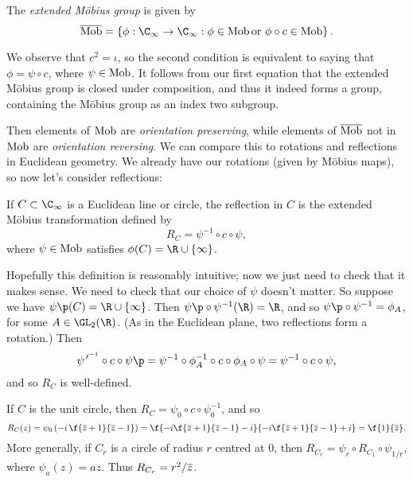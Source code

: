 \begin{definition}
	The \emph{extended Möbius group} is given by
	\begin{equation*}
		\overline{\Mobgp} = \left\{ \phi:\C_\infty \to \C_\infty : \phi\in\Mobgp \text{or } \phi\circ c\in\Mobgp \right\}.
	\end{equation*}
\end{definition}

We observe that $c^2=\iota$, so the second condition is equivalent to saying that $\phi = \psi\circ c$, where $\psi\in\operatorname{Mob}$. It follows from our first equation that the extended Möbius group is closed under composition, and thus it indeed forms a group, containing the Möbius group as an index two subgroup.

Then elements of $\operatorname{Mob}$ are \emph{orientation preserving}, while elements of $\overline{\operatorname{Mob}}$ not in $\operatorname{Mob}$ are \emph{orientation reversing}. We can compare this to rotations and reflections in Euclidean geometry. We already have our rotations (given by Möbius maps), so now let's consider reflections:

\begin{definition}
	If $C\subset\C_\infty$ is a Euclidean line or circle, the reflection in $C$ is the extended Möbius transformation defined by
	\begin{equation*}
		R_C = \psi^{-1} \circ c \circ \psi,
	\end{equation*}
	where $\psi\in\operatorname{Mob}$ satisfies $\phi(C) = \R\cup\{\infty\}$.
\end{definition}

Hopefully this definition is reasonably intuitive; now we just need to check that it makes sense. We need to check that our choice of $\psi$ doesn't matter. So suppose we have $\psi\p(C)=\R\cup\{\infty\}$. Then $\psi\p \circ \psi^{-1}(\R) = \R$, and so $\psi\p \circ \psi^{-1} = \phi_A$, for some $A\in\GL_2(\R)$. (As in the Euclidean plane, two reflections form a rotation.) Then
\begin{equation*}
	\psi^{\,\prime^{-1}} \circ c \circ \psi\p
	= \psi^{-1} \circ \phi^{-1}_A \circ c \circ \phi_A \circ \psi
	= \psi^{-1} \circ c \circ \psi,
\end{equation*}
and so $R_C$ is well-defined.

\begin{example}
	If $C$ is the unit circle, then $R_C=\psi_0 \circ c \circ \psi_0^{-1}$, and so
	\begin{equation*}
		R_C(z)
		= \psi_0\left( -i\,\f{\zbar+1}{\zbar-1} \right)
		= \f{-i\f{\zbar+1}{\zbar-1} - i}{-i\f{\zbar+1}{\zbar-1} + i}
		= \f{1}{\zbar}.
	\end{equation*}
	More generally, if $C_r$ is a circle of radius $r$ centred at $0$, then $R_{C_r} = \psi_r \circ R_{C_1} \circ \psi_{1/r}$, where $\psi_a(z) = az$. Thus $R_{C_r} = r^2/\overline{z}$.
\end{example}

